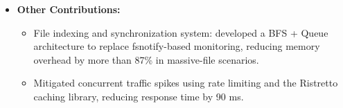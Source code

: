 \documentclass{resume}
\begin{document}
\begin{itemize}
    \item \textbf{Other Contributions:}
    \begin{itemize}
        \item File indexing and synchronization system: developed a BFS + Queue architecture to replace fsnotify-based monitoring, reducing memory overhead by more than 87\% in massive-file scenarios.
        \item Mitigated concurrent traffic spikes using rate limiting and the Ristretto caching library, reducing response time by 90 ms.
    \end{itemize}

\end{itemize}
\end{document}
